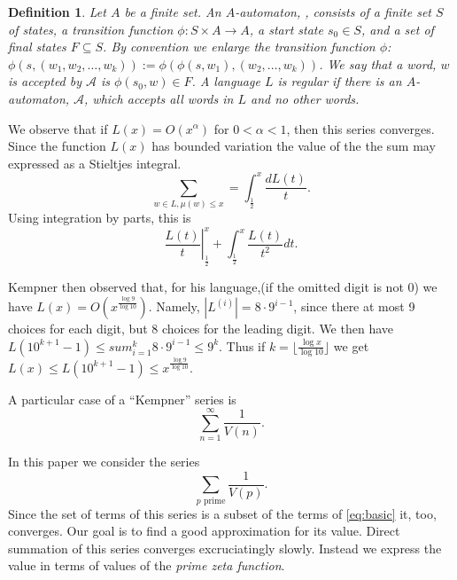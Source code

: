 \documentclass{article}
\newtheorem{definition}[section]{Definition}
\begin{document}
\begin{definition}
  Let $A$ be a finite set. An $A$-automaton, , consists of a finite set
  $S$ of \emph{states}, a \emph{transition function} $\phi: S \times A
  \rightarrow A$, a \emph{start state} $s_0 \in S$, and a set of
  \emph{final states} $F \subseteq S$. By convention we enlarge the
  transition function $\phi$:
  $\phi(s,(w_1,w_2,\dots,w_k)) := \phi(\phi(s,w_1), (w_2,\dots,
  w_k))$.
  We say that a word, $w$ is accepted by $\mathcal{A}$ is $\phi(s_0,
  w) \in F$.
  A language $L$ is \emph{regular} if there is an $A$-automaton,
  $\mathcal{A}$, which accepts all words in $L$ and no other words.
\end{definition}
We observe that if $L(x) = O(x^\alpha)$ for $0 < \alpha < 1$, then
this series converges. Since the function $L(x)$ has bounded variation
the value of the the sum may expressed as a Stieltjes integral.
\begin{equation}
  \label{eq:stieltjes}
  \sum_{w \in L, \mu(w) \le x} = \int_{\frac{1}{2}}^x\frac{d L(t)}{t}.
\end{equation}
Using integration by parts, this is
\begin{equation}
  \label{eq:parts}
  \left. \frac{L(t)}{t} \right|_{\frac{1}{2}}^x + \int_{\frac{1}{2}}^x
  \frac{L(t)}{t^2} dt.
\end{equation}

Kempner then observed that, for his language,(if the omitted digit is
not 0) we have $L(x) =
O(x^{\frac{\log 9}{\log 10}})$. Namely, $|L^{(i)}| = 8\cdot 9^{i-1}$, since
there at most 9 choices for each digit, but 8 choices for the leading
digit. We then have $L(10^{k+1}-1) \le
sum_{i=1}^k 8\cdot 9^{i-1} \le 9^k.$ Thus if $k=\lfloor
\frac{\log x}{\log 10} \rfloor$ we get $L(x) \le L(10^{k+1}-1) \le
x^{\frac{\log 9}{\log {10}}}$.

A particular case of a ``Kempner'' series is
\begin{displaymath}
  \sum_{n=1}^\infty \frac{1}{V(n)}.
\end{displaymath}
 
In this paper we consider the series
\begin{equation}
  \label{eq:main:series}
  \sum_{p \text{ prime}} \frac{1}{V(p)}.
\end{equation}
Since the set of terms of this series is a subset of the terms of
\eqref{eq:basic} it, too, converges. Our goal is to find a good
approximation for its value. Direct summation of this series converges
excruciatingly slowly. Instead we express the value in terms of values
of the \emph{prime zeta function}.
\end{document}
